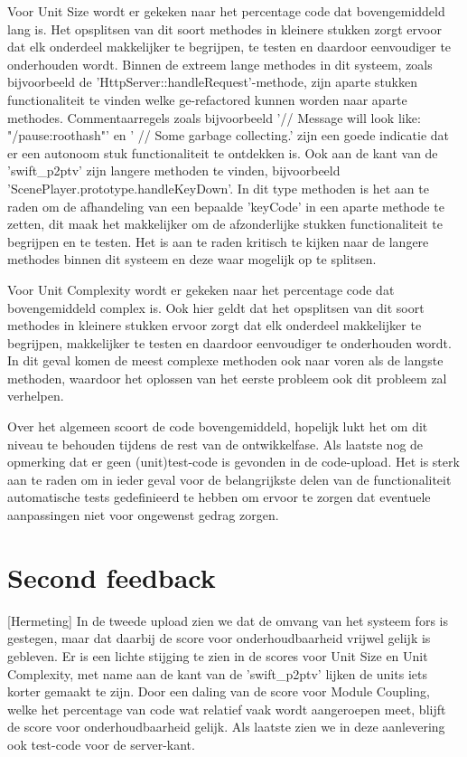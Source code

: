 Voor Unit Size wordt er gekeken naar het percentage code dat bovengemiddeld lang is. Het opsplitsen van dit soort methodes in kleinere stukken zorgt ervoor dat elk onderdeel makkelijker te begrijpen, te testen en daardoor eenvoudiger te onderhouden wordt. Binnen de extreem lange methodes in dit systeem, zoals bijvoorbeeld de 'HttpServer::handleRequest'-methode, zijn aparte stukken functionaliteit te vinden welke ge-refactored kunnen worden naar aparte methodes. Commentaarregels zoals bijvoorbeeld '// Message will look like: "/pause:roothash"' en ' // Some garbage collecting.' zijn een goede indicatie dat er een autonoom stuk functionaliteit te ontdekken is. Ook aan de kant van de 'swift\_p2ptv' zijn langere methoden te vinden, bijvoorbeeld 'ScenePlayer.prototype.handleKeyDown'. In dit type methoden is het aan te raden om de afhandeling van een bepaalde 'keyCode' in een aparte methode te zetten, dit maak het makkelijker om de afzonderlijke stukken functionaliteit te begrijpen en te testen. Het is aan te raden kritisch te kijken naar de langere methodes binnen dit systeem en deze waar mogelijk op te splitsen.

Voor Unit Complexity wordt er gekeken naar het percentage code dat bovengemiddeld complex is. Ook hier geldt dat het opsplitsen van dit soort methodes in kleinere stukken ervoor zorgt dat elk onderdeel makkelijker te begrijpen, makkelijker te testen en daardoor eenvoudiger te onderhouden wordt. In dit geval komen de meest complexe methoden ook naar voren als de langste methoden, waardoor het oplossen van het eerste probleem ook dit probleem zal verhelpen.

Over het algemeen scoort de code bovengemiddeld, hopelijk lukt het om dit niveau te behouden tijdens de rest van de ontwikkelfase. Als laatste nog de opmerking dat er geen (unit)test-code is gevonden in de code-upload. Het is sterk aan te raden om in ieder geval voor de belangrijkste delen van de functionaliteit automatische tests gedefinieerd te hebben om ervoor te zorgen dat eventuele aanpassingen niet voor ongewenst gedrag zorgen.

\section{Second feedback}
[Hermeting]
In de tweede upload zien we dat de omvang van het systeem fors is gestegen, maar dat daarbij de score voor onderhoudbaarheid vrijwel gelijk is gebleven. Er is een lichte stijging te zien in de scores voor Unit Size en Unit Complexity, met name aan de kant van de 'swift\_p2ptv' lijken de units iets korter gemaakt te zijn. Door een daling van de score voor Module Coupling, welke het percentage van code wat relatief vaak wordt aangeroepen meet, blijft de score voor onderhoudbaarheid gelijk. Als laatste zien we in deze aanlevering ook test-code voor de server-kant.

